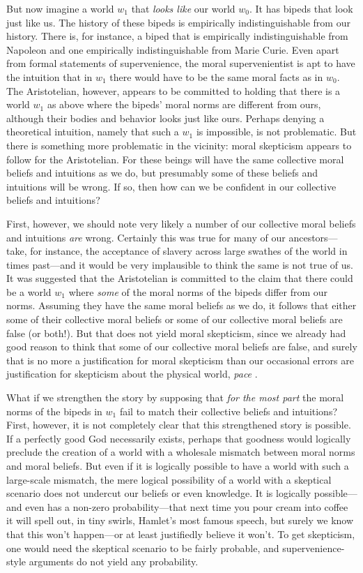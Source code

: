 But now imagine a world $w_1$ that \textit{looks like} our world $w_0$. It has bipeds that look  just like us. The history of these bipeds
is empirically indistinguishable from our history. 
There is, for instance, a biped that is empirically indistinguishable from Napoleon and
one empirically indistinguishable from Marie Curie. Even apart from formal statements of supervenience, the moral supervenientist is apt to have the intuition that in $w_1$ there would have to be the same moral facts as in $w_0$. 
The Aristotelian, however, appears to be committed to holding that there is a world $w_1$ as above where the
bipeds' moral norms are different from ours, although their bodies and behavior looks just like ours. 
Perhaps denying a theoretical intuition, namely that such a $w_1$ is impossible,
is not problematic. But there is something more problematic in the vicinity: 
moral skepticism appears to follow for the Aristotelian.
For these beings will have the same collective moral beliefs and intuitions as we do, but presumably some of these 
beliefs and intuitions will be wrong. If so, then how can we be confident in our collective beliefs and 
intuitions?

First, however, we should note very likely a number of our collective moral beliefs and intuitions \textit{are}
wrong. Certainly this was true for many of our ancestors---take, for instance, the acceptance of
slavery across large swathes of the world in times past---and it would be very implausible to think the 
same is not true of us. It was suggested that the Aristotelian is committed to the claim that there could be a world
$w_1$ where \textit{some} of the moral norms of the bipeds differ from our norms. Assuming they have the same 
moral beliefs as we do, it follows that either some of their collective moral beliefs or some of our collective 
moral beliefs are false (or both!). But that does not yield moral skepticism, since we already had good reason to think
that some of our collective moral beliefs are false, and surely that is no more a justification for moral skepticism than
our occasional errors are justification for skepticism about the physical world, \textit{pace} .

What if we strengthen the story by supposing that \textit{for the most part} the moral norms of the bipeds 
in $w_1$ fail to match their collective beliefs and intuitions? First, however, it is not completely clear that this
strengthened story is possible. If a perfectly good God necessarily exists, perhaps that goodness would logically preclude the 
creation of a world with a wholesale mismatch between moral norms and moral beliefs. 
But even if it is logically possible to have a world with such a large-scale mismatch, the mere logical 
possibility of a world with a skeptical scenario does not undercut our beliefs or even knowledge. 
It is logically possible---and even has a non-zero probability---that next time you pour cream into coffee
it will spell out, in tiny swirls, Hamlet's most famous speech, but surely we know that this won't happen---or at 
least justifiedly believe it won't. To get skepticism, one would need the skeptical scenario to be fairly
probable, and supervenience-style arguments do not yield any probability.

